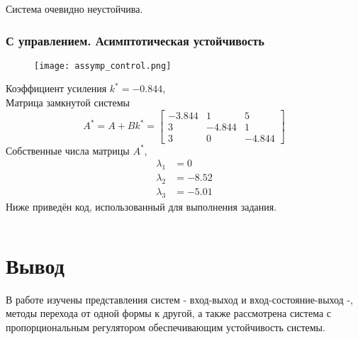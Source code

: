     Система очевидно неустойчива.

    \subsubsection*{С управлением. Асимптотическая устойчивость}
    \begin{figure}[H]
        \centering
        \texttt{[image: assymp\_control.png]}
    \end{figure}
    Коэффициент усиления $k^* = -0.844$,\\
    Матрица замкнутой системы
    \begin{equation*}
        A^* = A + Bk^* =
        \begin{bmatrix}
            -3.844& 1& 5\\
            3& -4.844& 1\\
            3& 0& -4.844
        \end{bmatrix}
    \end{equation*}
    Собственные числа матрицы $A^*$,
    \begin{equation*}
        \begin{aligned}
            \lambda_1 &= 0 \\
            \lambda_2 &= -8.52\\
            \lambda_3 &= -5.01
        \end{aligned}
    \end{equation*}
    Ниже приведён код, использованный для выполнения задания.
    \inputminted[linenos, frame=single, breakanywhere]{octave}{../src/L1T3.m}

    \section*{Вывод}
    В работе изучены представления систем - вход-выход и вход-состояние-выход -, методы перехода от одной формы к другой,
    а также рассмотрена система с пропорциональным регулятором обеспечивающим устойчивость системы.

